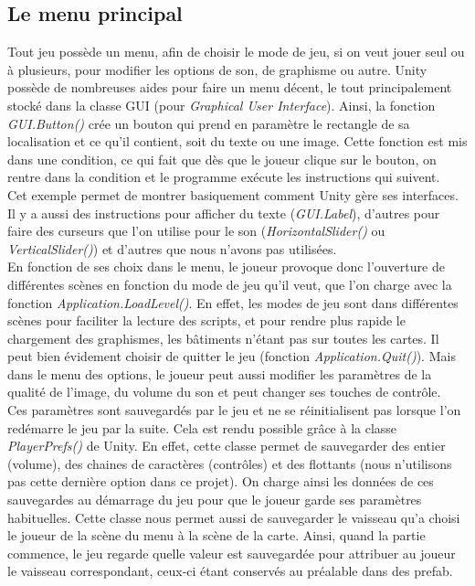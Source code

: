 \documentclass[12pt, titlepage]{article}
\begin{document}
\begin{spacing}{1.5}
\subsection{Le menu principal}

Tout jeu possède un menu, afin de choisir le mode de jeu, si on veut jouer seul ou à plusieurs, pour modifier les options de son, de graphisme ou autre. Unity possède de nombreuses aides pour faire un menu décent, le tout principalement stocké dans la classe GUI (pour \textit{Graphical User Interface}). Ainsi, la fonction \textit{GUI.Button()} crée un bouton qui prend en paramètre le rectangle de sa localisation et ce qu'il contient, soit du texte ou une image. Cette fonction est mis dans une condition, ce qui fait que dès que le joueur clique sur le bouton, on rentre dans la condition et le programme exécute les instructions qui suivent.\\

Cet exemple permet de montrer basiquement comment Unity gère ses interfaces. Il y a aussi des instructions pour afficher du texte (\textit{GUI.Label}), d'autres pour faire des curseurs que l'on utilise pour le son (\textit{HorizontalSlider()} ou \textit{VerticalSlider()}) et d'autres que nous n'avons pas utilisées.\\

En fonction de ses choix dans le menu, le joueur provoque donc l'ouverture de différentes scènes en fonction du mode de jeu qu'il veut, que l'on charge avec la fonction \textit{Application.LoadLevel()}. En effet, les modes de jeu sont dans différentes scènes pour faciliter la lecture des scripts, et pour rendre plus rapide le chargement des graphismes, les bâtiments n'étant pas sur toutes les cartes. Il peut bien évidement choisir de quitter le jeu (fonction \textit{Application.Quit()}). Mais dans le menu des options, le joueur peut aussi modifier les paramètres de la qualité de l'image, du volume du son et peut changer ses touches de contrôle.\\

Ces paramètres sont sauvegardés par le jeu et ne se réinitialisent pas lorsque l'on redémarre le jeu par la suite. Cela est rendu possible grâce à la classe \textit{PlayerPrefs()} de Unity. En effet, cette classe permet de sauvegarder des entier (volume), des chaines de caractères (contrôles) et des flottants (nous n'utilisons pas cette dernière option dans ce projet). On charge ainsi les données de ces sauvegardes au démarrage du jeu pour que le joueur garde ses paramètres habituelles. Cette classe nous permet aussi de sauvegarder le vaisseau qu'a choisi le joueur de la scène du menu à la scène de la carte. Ainsi, quand la partie commence, le jeu regarde quelle valeur est sauvegardée pour attribuer au joueur le vaisseau correspondant, ceux-ci étant conservés au préalable dans des prefab.\\


\end{spacing}
\end{document}
